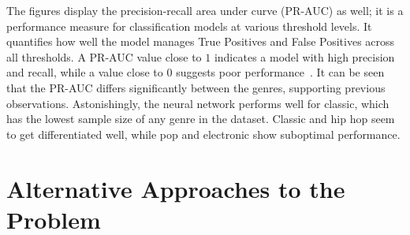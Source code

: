 \documentclass[
  12pt,
  bibliography=totoc,     %
  captions=tableheading,  %
  titlepage=firstiscover, %
]{scrartcl}
\begin{document}
\noindent
The figures display the precision-recall area under curve (PR-AUC) as well; it is a performance measure for classification models at various threshold levels. It quantifies
how well the model manages True Positives and False Positives across all thresholds. A PR-AUC value close to $1$ indicates a model with high precision and recall, while a
value close to $0$ suggests poor performance~\cite{geron}. It can be seen that the PR-AUC differs significantly between the genres, supporting previous observations.
Astonishingly, the neural network performs well for classic, which has the lowest sample size of any genre in the dataset.
Classic and hip hop seem to get differentiated well, while pop and electronic show suboptimal performance.

\section{Alternative Approaches to the Problem}
\end{document}
